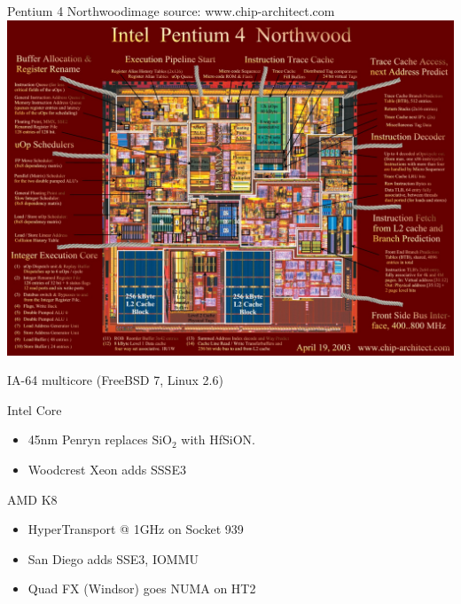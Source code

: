 \documentclass[mathserif,xcolor={dvipsnames,table}]{beamer}
\begin{document}
\begin{frame}{Pentium 4 Northwood\hfill\tiny{image source: www.chip-architect.com}}
\includegraphics[width=\textwidth]{images/northwood.jpg}
\end{frame}

\begin{frame}[t]{IA-64 multicore (FreeBSD 7, Linux 2.6)}
\begin{block}{Intel Core}
\begin{itemize}
\item 45nm Penryn replaces $\text{SiO}_2$ with HfSiON.
\item Woodcrest Xeon adds SSSE3
\end{itemize}
\end{block}
\begin{block}{AMD K8}
\begin{itemize}
\item HyperTransport @ 1GHz on Socket 939
\item San Diego adds SSE3, IOMMU
\item Quad FX (Windsor) goes NUMA on HT2
\end{itemize}
\end{block}
\vfill
\begin{center}
\end{center}
\end{frame}
\end{document}
